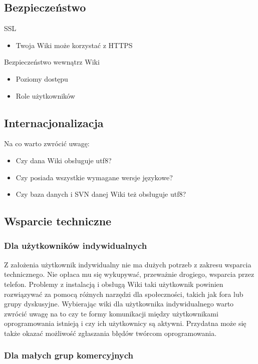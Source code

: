 \documentclass{article}
\begin{document}
	\subsection{Bezpieczeństwo}
		SSL
		\begin{itemize}
			\item Twoja Wiki może korzystać z HTTPS
		\end{itemize}
		Bezpieczeństwo wewnątrz Wiki
		\begin{itemize}
			\item Poziomy dostępu
			\item Role użytkowników
		\end{itemize}
	\subsection{Internacjonalizacja}
		Na co warto zwrócić uwagę:
		\begin{itemize}
			\item Czy dana Wiki obsługuje utf8?
			\item Czy posiada wszystkie wymagane wersje językowe?
			\item Czy baza danych i SVN danej Wiki też obsługuje utf8?
		\end{itemize}
			
	\subsection{Wsparcie techniczne}
		\subsubsection{Dla użytkowników indywidualnych}


			Z założenia użytkownik indywidualny nie ma dużych potrzeb z zakresu wsparcia technicznego. Nie opłaca mu się wykupywać, przeważnie drogiego, wsparcia przez telefon. Problemy z instalacją i obsługą Wiki taki użytkownik powinien rozwiązywać za pomocą różnych narzędzi dla społeczności, takich jak fora lub grupy dyskusyjne. Wybierając wiki dla użytkownika indywidualnego warto zwrócić uwagę na to czy te formy komunikacji między użytkownikami oprogramowania istnieją i czy ich użytkownicy są aktywni. Przydatna może się także okazać możliwość zgłaszania błędów twórcom oprogramowania.
		
		\subsubsection{Dla małych grup komercyjnych}
\end{document}
